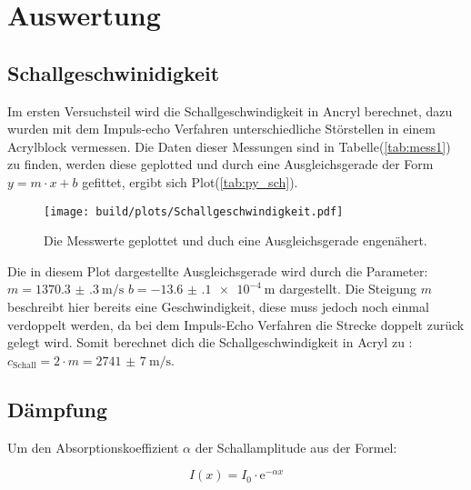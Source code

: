 \section{Auswertung}

    \subsection{Schallgeschwinidigkeit}

        \noindent Im ersten Versuchsteil wird die Schallgeschwindigkeit in Ancryl berechnet, dazu wurden mit dem Impuls-echo Verfahren 
        unterschiedliche Störstellen in einem Acrylblock vermessen. Die Daten dieser Messungen sind in Tabelle(\ref{tab:mess1}) zu finden, werden 
        diese geplotted und durch eine Ausgleichsgerade der Form $y = m \cdot x + b$ gefittet, ergibt sich Plot(\ref{tab:py_sch}).

        \begin{figure}[h]
            \centering
            \texttt{[image: build/plots/Schallgeschwindigkeit.pdf]}
            \caption{Die Messwerte geplottet und duch eine Ausgleichsgerade engenähert.}
            \label{img:py_sch}
        \end{figure}

        \noindent Die in diesem Plot dargestellte Ausgleichsgerade wird durch die Parameter: \newline
        $m = \SI{1370.3(3)}{\metre\per\second}$ \newline
        $b = \SI{-13.6(1)e-4}{\metre}$          \newline
        dargestellt. Die Steigung $m$ beschreibt hier bereits eine Geschwindigkeit, diese muss jedoch noch einmal verdoppelt werden, da bei dem 
        Impuls-Echo Verfahren die Strecke doppelt zurück gelegt wird. Somit berechnet dich die Schallgeschwindigkeit in Acryl zu : \newline
        $c_{\text{Schall}} = 2 \cdot m = \SI{2741(7)}{\metre\per\second}$.

    \subsection{Dämpfung}

        \noindent Um den Absorptionskoeffizient $\alpha$ der Schallamplitude aus der Formel:

        \begin{equation*}
            I(x) = I_0 \cdot \text{e}^{-\alpha x}
        \end{equation*}

